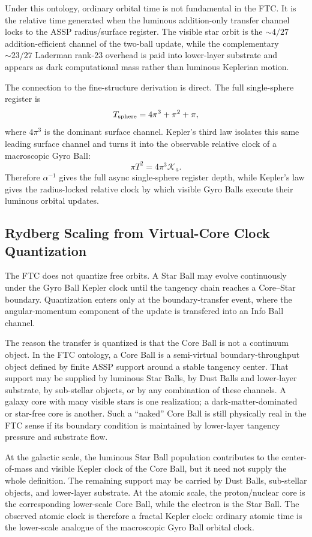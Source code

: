 \documentclass[11pt,a4paper]{article}
\begin{document}
Under this ontology, ordinary orbital time is not fundamental in the FTC. It is the relative time generated when the luminous addition-only transfer channel locks to the ASSP radius/surface register. The visible star orbit is the \(\sim4/27\) addition-efficient channel of the two-ball update, while the complementary \(\sim23/27\) Laderman rank-23 overhead is paid into lower-layer substrate and appears as dark computational mass rather than luminous Keplerian motion.

The connection to the fine-structure derivation is direct. The full single-sphere register is
\[
T_{\rm sphere}=4\pi^3+\pi^2+\pi,
\]
where \(4\pi^3\) is the dominant surface channel. Kepler's third law isolates this same leading surface channel and turns it into the observable relative clock of a macroscopic Gyro Ball:
\[
\pi T^2 = 4\pi^3\mathcal{K}_a.
\]
Therefore \(\alpha^{-1}\) gives the full async single-sphere register depth, while Kepler's law gives the radius-locked relative clock by which visible Gyro Balls execute their luminous orbital updates.


\subsection{Rydberg Scaling from Virtual-Core Clock Quantization}
\label{sec:rydberg_virtual_core}

The FTC does not quantize free orbits. A Star Ball may evolve continuously under the Gyro Ball Kepler clock until the tangency chain reaches a Core--Star boundary. Quantization enters only at the boundary-transfer event, where the angular-momentum component of the update is transfered into an Info Ball channel.

The reason the transfer is quantized is that the Core Ball is not a continuum object. In the FTC ontology, a Core Ball is a semi-virtual boundary-throughput object defined by finite ASSP support around a stable tangency center. That support may be supplied by luminous Star Balls, by Dust Balls and lower-layer substrate, by sub-stellar objects, or by any combination of these channels. A galaxy core with many visible stars is one realization; a dark-matter-dominated or star-free core is another. Such a ``naked'' Core Ball is still physically real in the FTC sense if its boundary condition is maintained by lower-layer tangency pressure and substrate flow.

At the galactic scale, the luminous Star Ball population contributes to the center-of-mass and visible Kepler clock of the Core Ball, but it need not supply the whole definition. The remaining support may be carried by Dust Balls, sub-stellar objects, and lower-layer substrate. At the atomic scale, the proton/nuclear core is the corresponding lower-scale Core Ball, while the electron is the Star Ball. The observed atomic clock is therefore a fractal Kepler clock: ordinary atomic time is the lower-scale analogue of the macroscopic Gyro Ball orbital clock.
\end{document}
